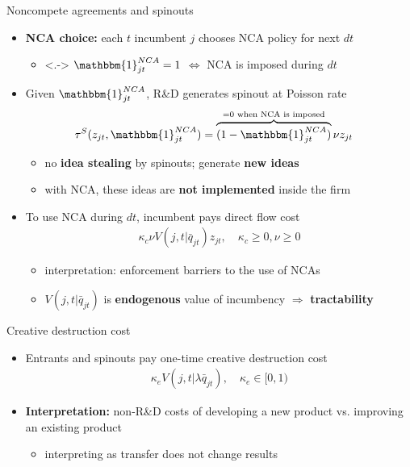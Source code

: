 \documentclass[english,usenames,dvipsnames]{beamer}
\begin{document}
\begin{frame}{Noncompete agreements and spinouts}
	\begin{itemize}
		\item<+-> \alert{\textbf{NCA choice:}} each $t$ incumbent $j$ chooses NCA policy for next $dt$
		\begin{itemize}
			\item<.-> $\mathbbm{1}^{NCA}_{jt} = 1$ $\Leftrightarrow$ NCA is imposed during $dt$
		\end{itemize}
		\bigskip
		\item<+-> Given $\mathbbm{1}^{NCA}_{jt}$, R\&D generates spinout at Poisson rate
		\begin{align*}
		\tau^S(z_{jt},\mathbbm{1}^{NCA}_{jt}) &= \overbrace{(1-\mathbbm{1}_{jt}^{NCA})}^{\mathclap{= 0 \text{ when NCA is imposed}}} \nu z_{jt}
		\end{align*}
		\begin{itemize}
			\item no \alert{\textbf{idea stealing}} by spinouts; generate \alert{\textbf{new ideas}}
			\item with NCA, these ideas are \alert{\textbf{not implemented}} inside the firm
		\end{itemize}
		\bigskip
		\item<+-> To use NCA during $dt$, incumbent pays direct flow cost 
		\begin{align*}
			\kappa_c \nu V(j,t | \bar{q}_{jt}) z_{jt}, \quad \kappa_c \ge 0, \nu \ge 0
		\end{align*}
		\vspace{-17pt} 
		\begin{itemize}
			\item<+-> interpretation: enforcement barriers to the use of NCAs
			\item<+-> $V(j,t|\bar{q}_{jt})$ is \alert{\textbf{endogenous}} value of incumbency $\Rightarrow$ \alert{\textbf{tractability}} 
		\end{itemize}
	\end{itemize}
\end{frame}

\begin{frame}{Creative destruction cost}
	\begin{itemize}
		\item Entrants and spinouts pay one-time creative destruction cost
		\begin{align*}
			\kappa_e V(j,t|\lambda \bar{q}_{jt}), \quad \kappa_e \in [0,1)
		\end{align*}
		\smallskip
		\item \alert{\textbf{Interpretation:}} non-R\&D costs of developing a new product vs. improving an existing product
		\begin{itemize}
			\item interpreting as transfer does not change results
		\end{itemize}
	\end{itemize}
\end{frame}
\end{document}
